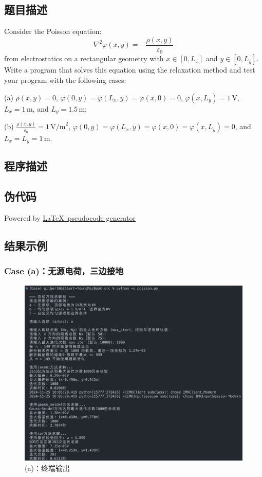 \subsection{题目描述}
\noindent
Consider the Poisson equation:
\[
    \nabla^2 \varphi(x, y) = -\frac{\rho(x, y)}{\varepsilon_0}
\]
from electrostatics on a rectangular geometry with \(x \in [0, L_x]\) and \(y \in [0, L_y]\). Write a program that solves this equation using the relaxation method and test your program with the following cases:

\noindent
(a) \(\rho(x, y) = 0\), \(\varphi(0, y) = \varphi(L_x, y) = \varphi(x, 0) = 0\), \(\varphi(x, L_y) = 1 \, \text{V}\),
\(L_x = 1 \, \text{m}\), and \(L_y = 1.5 \, \text{m}\);

\noindent
(b) \(\frac{\rho(x, y)}{\varepsilon_0} = 1 \, \text{V/m}^2\), \(\varphi(0, y) = \varphi(L_x, y) = \varphi(x, 0) = \varphi(x, L_y) = 0\), and \(L_x = L_y = 1 \, \text{m}\).


\subsection{程序描述}

\subsection{伪代码}
Powered by \href{https://chatgpt.com/g/g-xJJAA2awf-latex-pseudocode-generator}{\LaTeX \ pseudocode generator}


\subsection{结果示例}
\subsubsection{Case (a)：无源电荷，三边接地}
\begin{figure}[H]
    \centering
    \includegraphics[width=1.0\textwidth]{Problem_1/figs/a_terminal.png}
    \caption{(a)：终端输出}
\end{figure}

